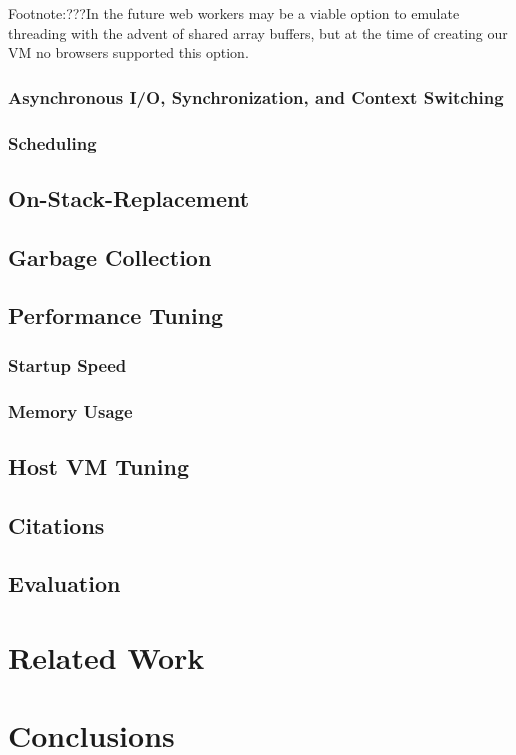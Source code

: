 \documentclass{acm_proc_article-sp}
\begin{document}
Footnote:???In the future web workers may be a viable option to emulate threading with the advent of shared array buffers, but at the time of creating our VM no browsers supported this option.

\subsubsection{Asynchronous I/O, Synchronization, and Context Switching}

\subsubsection{Scheduling}

\subsection{On-Stack-Replacement}

\subsection{Garbage Collection}

\subsection{Performance Tuning}

\subsubsection{Startup Speed}

\subsubsection{Memory Usage}

\subsection{Host VM Tuning}

\subsection{Citations}

\subsection{Evaluation}

\section{Related Work}

\section{Conclusions}


\end{document}
